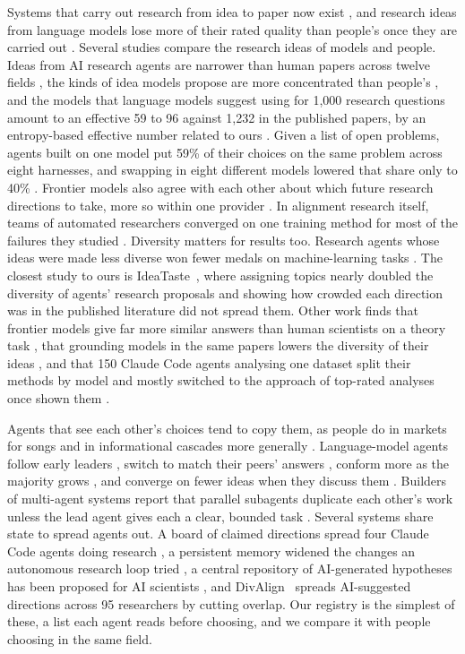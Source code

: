 \documentclass[11pt]{article}
\begin{document}
Systems that carry out research from idea to paper now exist
\citep{lu2024,yamada2025aiscientistv2}, and research ideas from language
models lose more of their rated quality than people's once they are
carried out \citep{si2025execution}. Several studies compare the
research ideas of models and people. Ideas from AI research agents are
narrower than human papers across twelve fields \citep{tang2026narrow},
the kinds of idea models propose are more concentrated than people's
\citep{chenzhao2026gap}, and the models that language models suggest
using for 1,000 research questions amount to an effective 59 to 96
against 1,232 in the published papers, by an entropy-based effective
number related to ours \citep{carlon2026methods}. Given a list of open
problems, agents built on one model put 59\% of their choices on the
same problem across eight harnesses, and swapping in eight different
models lowered that share only to 40\% \citep{zhou2026alphaidea}.
Frontier models also agree with each other about which future research
directions to take, more so within one provider \citep{trehan2026taste}.
In alignment research itself, teams of automated researchers converged
on one training method for most of the failures they studied
\citep{chenyh2026}. Diversity matters for results too. Research agents
whose ideas were made less diverse won fewer medals on machine-learning
tasks \citep{audranreiss2025}. The closest study to ours is
IdeaTaste~\citep{zhong2026}, where assigning topics nearly doubled the
diversity of agents' research proposals and showing how crowded each
direction was in the published literature did not spread them. Other
work finds that frontier models give far more similar answers than human
scientists on a theory task \citep{li2026}, that grounding models in the
same papers lowers the diversity of their ideas \citep{wang2026}, and
that 150 Claude Code agents analysing one dataset split their methods by
model and mostly switched to the approach of top-rated analyses once
shown them \citep{gao2026}.

Agents that see each other's choices tend to copy them, as people do in
markets for songs \citep{salganik2006} and in informational cascades
more generally \citep{bikhchandani1992}. Language-model agents follow
early leaders \citep{hashemi2026}, switch to match their peers' answers
\citep{cho2025}, conform more as the majority grows
\citep{weng2025conformity}, and converge on fewer ideas when they
discuss them \citep{chen2026}. Builders of multi-agent systems report
that parallel subagents duplicate each other's work unless the lead
agent gives each a clear, bounded task \citep{anthropic2025multiagent}.
Several systems share state to spread agents out. A board of claimed
directions spread four Claude Code agents doing research
\citep{ren2026coral}, a persistent memory widened the changes an
autonomous research loop tried \citep{he2026beneath}, a central
repository of AI-generated hypotheses has been proposed for AI
scientists \citep{bisht2026agentic}, and DivAlign~\citep{xu2026} spreads
AI-suggested directions across 95 researchers by cutting overlap. Our
registry is the simplest of these, a list each agent reads before
choosing, and we compare it with people choosing in the same field.
\end{document}
